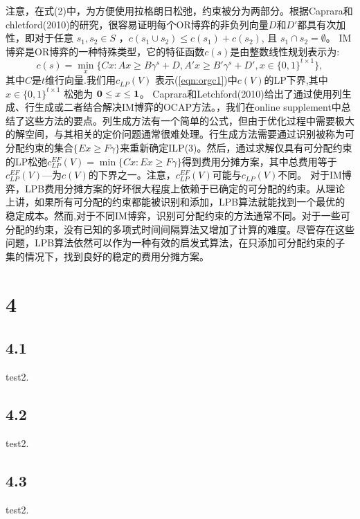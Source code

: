 \documentclass[UTF8]{article}
\begin{document}
注意，在式(2)中，为方便使用拉格朗日松弛，约束被分为两部分。根据Caprara和chletford(2010)的研究，很容易证明每个OR博弈的非负列向量$D$和$D'$都具有次加性，即对于任意 $s_1,s_2 \in S$ ，$c(s_1 \cup s_2) \leq c(s_1) + c(s_2)$, 且 $s_1 \cap s_2 = \emptyset$。
IM博弈是OR博弈的一种特殊类型，它的特征函数$c(s) $是由整数线性规划表示为:
\begin{equation}\label{eqn:orgc1}
c(s) = \min_{x} \big\{ Cx:Ax \geq B\gamma^s + D, A'x \geq B'\gamma^s + D', x \in \{0,1\}^{t \times 1} \big\},
\end{equation}
其中$C$是$t$维行向量.我们用$c_{LP}(V)$ 表示(\ref{eqn:orgc1})中$c(V)$的LP下界,其中$x \in \{0,1\}^{t \times 1}$ 松弛为 ${\bf 0}\leq x \leq {\bf 1}$。
Caprara和Letchford(2010)给出了通过使用列生成、行生成或二者结合解决IM博弈的OCAP方法。，我们在online supplement中总结了这些方法的要点。列生成方法有一个简单的公式，但由于优化过程中需要极大的解空间，与其相关的定价问题通常很难处理。行生成方法需要通过识别被称为可分配约束的集合$\{ Ex \geq F\gamma\}$来重新确定ILP(3)。然后，通过求解仅具有可分配约束的LP松弛$c_{LP}^{EF}(V)=\min\{ Cx : Ex \geq F\gamma\}$得到费用分摊方案，其中总费用等于$c_{LP}^{EF}(V)$—为$c(V)$的下界之一。注意，$c_{LP}^{EF}(V)$可能与$c_{LP}(V)$不同。
对于IM博弈，LPB费用分摊方案的好坏很大程度上依赖于已确定的可分配的约束。从理论上讲，如果所有可分配的约束都能被识别和添加，LPB算法就能找到一个最优的稳定成本。然而,对于不同IM博弈，识别可分配约束的方法通常不同。对于一些可分配的约束，没有已知的多项式时间间隔算法又增加了计算的难度。尽管存在这些问题，LPB算法依然可以作为一种有效的启发式算法，在只添加可分配约束的子集的情况下，找到良好的稳定的费用分摊方案。

\section{4}




    \subsection{4.1} test2.


    \subsection{4.2} test2.

    \subsection{4.3}  test2.
\end{document}
